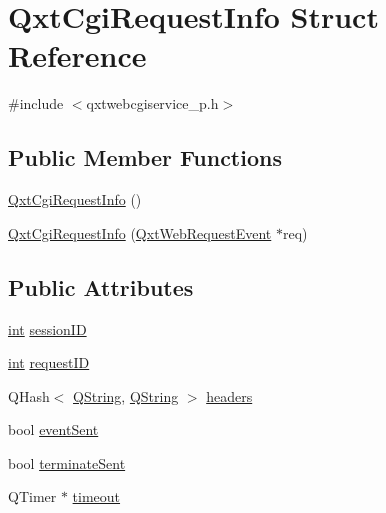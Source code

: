 \hypertarget{struct_qxt_cgi_request_info}{\section{Qxt\-Cgi\-Request\-Info Struct Reference}
\label{struct_qxt_cgi_request_info}
}


{\ttfamily \#include $<$qxtwebcgiservice\-\_\-p.\-h$>$}

\subsection*{Public Member Functions}
\begin{DoxyCompactItemize}
\item 
\hyperlink{struct_qxt_cgi_request_info_a434dafe93b62cdca7dd8f304f4fcddc5}{Qxt\-Cgi\-Request\-Info} ()
\item 
\hyperlink{struct_qxt_cgi_request_info_a81364c344a5a800f84ac0f2c984108b8}{Qxt\-Cgi\-Request\-Info} (\hyperlink{class_qxt_web_request_event}{Qxt\-Web\-Request\-Event} $\ast$req)
\end{DoxyCompactItemize}
\subsection*{Public Attributes}
\begin{DoxyCompactItemize}
\item 
\hyperlink{ioapi_8h_a787fa3cf048117ba7123753c1e74fcd6}{int} \hyperlink{struct_qxt_cgi_request_info_a0820031644e83635f3ba55bccd269c13}{session\-I\-D}
\item 
\hyperlink{ioapi_8h_a787fa3cf048117ba7123753c1e74fcd6}{int} \hyperlink{struct_qxt_cgi_request_info_a5626af924480e446660a8138be500f1a}{request\-I\-D}
\item 
Q\-Hash$<$ \hyperlink{group___u_a_v_objects_plugin_gab9d252f49c333c94a72f97ce3105a32d}{Q\-String}, \hyperlink{group___u_a_v_objects_plugin_gab9d252f49c333c94a72f97ce3105a32d}{Q\-String} $>$ \hyperlink{struct_qxt_cgi_request_info_ab890abe88b84d3aa7ccedeabbeda079f}{headers}
\item 
bool \hyperlink{struct_qxt_cgi_request_info_a1fa049df2f209513dd94384711c2d862}{event\-Sent}
\item 
bool \hyperlink{struct_qxt_cgi_request_info_a7c807ef728ade620a4625679532e0324}{terminate\-Sent}
\item 
Q\-Timer $\ast$ \hyperlink{struct_qxt_cgi_request_info_a7d01adea3d8039ebd4767ff1acd4459b}{timeout}
\end{DoxyCompactItemize}



